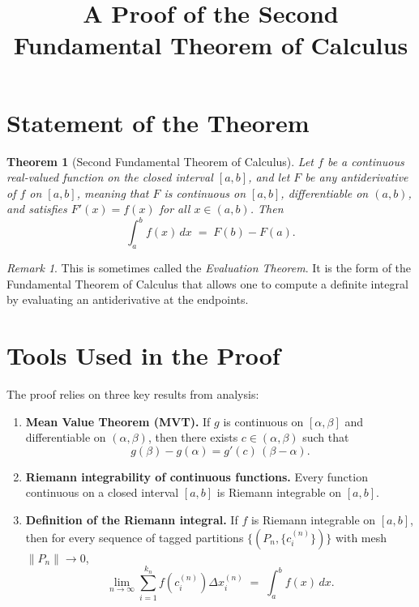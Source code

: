 \documentclass{article}
\title{A Proof of the Second Fundamental Theorem of Calculus}
\author{}
\date{}
\newtheorem{theorem}{Theorem}
\theoremstyle{remark}
\newtheorem*{remark}{Remark}
\begin{document}
\maketitle

\section*{Statement of the Theorem}

\begin{theorem}[Second Fundamental Theorem of Calculus]
Let $f$ be a continuous real-valued function on the closed interval $[a,b]$, and let $F$ be any antiderivative of $f$ on $[a,b]$, meaning that $F$ is continuous on $[a,b]$, differentiable on $(a,b)$, and satisfies $F'(x) = f(x)$ for all $x \in (a,b)$. Then
\[
\int_a^b f(x)\,dx \;=\; F(b) - F(a).
\]
\end{theorem}

\begin{remark}
This is sometimes called the \emph{Evaluation Theorem}. It is the form of the Fundamental Theorem of Calculus that allows one to compute a definite integral by evaluating an antiderivative at the endpoints.
\end{remark}

\section*{Tools Used in the Proof}

The proof relies on three key results from analysis:

\begin{enumerate}
\item \textbf{Mean Value Theorem (MVT).} If $g$ is continuous on $[\alpha, \beta]$ and differentiable on $(\alpha, \beta)$, then there exists $c \in (\alpha, \beta)$ such that
\[
g(\beta) - g(\alpha) = g'(c)\,(\beta - \alpha).
\]

\item \textbf{Riemann integrability of continuous functions.} Every function continuous on a closed interval $[a,b]$ is Riemann integrable on $[a,b]$.

\item \textbf{Definition of the Riemann integral.} If $f$ is Riemann integrable on $[a,b]$, then for every sequence of tagged partitions $\{(P_n, \{c_i^{(n)}\})\}$ with mesh $\|P_n\| \to 0$,
\[
\lim_{n \to \infty} \sum_{i=1}^{k_n} f\!\left(c_i^{(n)}\right) \Delta x_i^{(n)} \;=\; \int_a^b f(x)\,dx.
\]
\end{enumerate}
\end{document}
